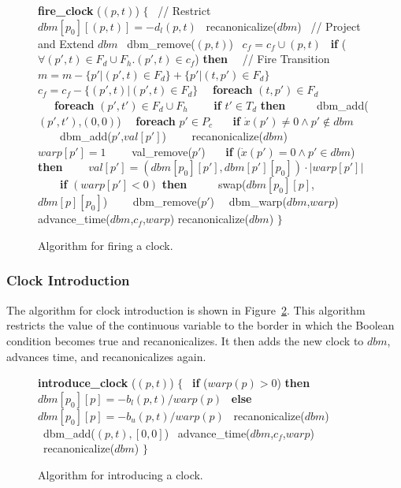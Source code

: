 \documentclass[11pt,times]{article}
\begin{document}
  \begin{figure}[htbp]
    \begin{algorithm}
      \small {\bf{fire\_clock}} ($(p, t)$) $\{$
      \ // Restrict
      \ $dbm[p_0][(p, t)] = -d_l(p, t)$
      \ recanonicalize($dbm$)
      \ // Project and  Extend $dbm$
      \ dbm\_remove($(p, t)$)
      \ $c_f = c_f \cup (p, t)$
      \ {\bf{if}} ($\forall (p', t) \in F_d \cup F_h . (p', t) \in c_f$) {\bf{then}}
      \ \ // Fire Transition
      \ \ $m = m - \{p' | (p',t) \in F_d \} + \{p' | (t,p') \in F_d \}$
      \ \ $c_f = c_f - \{ (p', t) | (p',t) \in F_d\}$
      \ \ {\bf{foreach}} $(t, p') \in F_d$
      \ \ \ {\bf{foreach}} $(p', t') \in F_d \cup F_h$
      \ \ \ \ {\bf{if}} $t' \in T_d$ {\bf{then}}
      \ \ \ \ \ dbm\_add($(p', t')$,$(0, 0)$)
      \ \ {\bf{foreach}} $p' \in P_c$
      \ \ \ {\bf{if}} $\dot{x}(p') \neq 0 \wedge p' \not\in dbm$
      \ \ \ \ dbm\_add($p'$,$val[p']$)
      \ \ \ \ recanonicalize($dbm$)
      \ \ \ \ $warp[p'] = 1$
      \ \ \ \ val\_remove($p'$)
      \ \ \ {\bf{if}} ($\dot{x}(p') = 0 \wedge p' \in dbm$) {\bf{then}}
      \ \ \ \ $val[p'] =  (dbm[p_0][p'], dbm[p'][p_0]) \cdot \left|warp[p'] \right|$
      \ \ \ \ {\bf{if}} $(warp[p'] < 0)$ {\bf{then}}
      \ \ \ \ \ swap($dbm[p_0][p]$, $dbm[p][p_0]$)
      \ \ \ \ dbm\_remove($p'$)
      \ \ dbm\_warp($dbm$,$warp$)
      advance\_time($dbm$,$c_f$,$warp$)
      recanonicalize($dbm$)
      $\}$
    \end{algorithm}
    \caption{\label{fire_clock}Algorithm for firing a clock.}
  \end{figure}
  
\subsubsection{Clock Introduction}

The algorithm for clock introduction is shown in
Figure~\ref{introduce_clock}.  This algorithm restricts the value of the 
continuous variable to the border in which the Boolean condition becomes true
and recanonicalizes.  It then adds the new clock to $dbm$, advances time, and
recanonicalizes again.

  \begin{figure}[htbp]
    \begin{algorithm}
      \small {\bf{introduce\_clock}} ($(p, t)$) $\{$
      \ {\bf{if}} ($warp(p) > 0$) {\bf{then}}
      \ \ $dbm[p_0][p] = -b_l(p, t) / warp(p)$
      \ {\bf{else}}
      \ \ $dbm[p_0][p] = -b_u(p, t) / warp(p)$
      \ recanonicalize($dbm$)
      \ dbm\_add($(p, t), [0, 0]$)
      \ advance\_time($dbm$,$c_f$,$warp$)
      \ recanonicalize($dbm$)
      $\}$    
    \end{algorithm}
    \caption{\label{introduce_clock}Algorithm for introducing a clock.}
  \end{figure}
\end{document}
